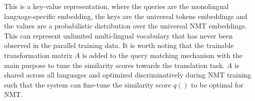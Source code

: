 This is a key-value representation, where the queries  are the monolingual language-specific embedding, the keys are the universal tokens embeddings and the values are a probabilistic distribution over the universal NMT embeddings. 
This can  represent  unlimited  multi-lingual vocabulary  that has  never been observed in the parallel training data.   
It is worth noting  that the trainable transformation matrix $A$ is added  to the query matching mechanism  with the main purpose to tune the similarity scores towards the translation task. 
$A$ is shared across all languages and optimized discriminatively during NMT training such that the system can fine-tune the similarity score $q()$ to be optimal for NMT.



